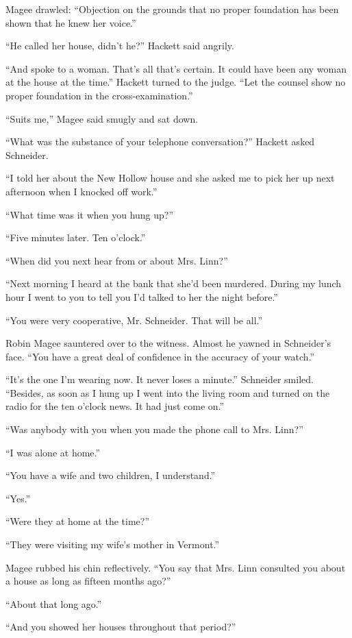 \documentclass{novel}
\begin{document}
Magee drawled: “Objection on the grounds that no proper foundation has been shown that he knew her voice.”

“He called her house, didn’t he?” Hackett said angrily.

“And spoke to a woman. That’s all that’s certain. It could have been any woman at the house at the time.” Hackett turned to the judge. “Let the counsel show no proper foundation in the cross-examination.”

“Suits me,” Magee said smugly and sat down.

“What was the substance of your telephone conversation?” Hackett asked Schneider.

“I told her about the New Hollow house and she asked me to pick her up next afternoon when I knocked off work.”

“What time was it when you hung up?”

“Five minutes later. Ten o’clock.”

“When did you next hear from or about Mrs. Linn?”

“Next morning I heard at the bank that she’d been murdered. During my lunch hour I went to you to tell you I’d talked to her the night before.”

“You were very cooperative, Mr. Schneider. That will be all.”

\scenestars

Robin Magee sauntered over to the witness. Almost he yawned in Schneider’s face. “You have a great deal of confidence in the accuracy of your watch.”

“It’s the one I’m wearing now. It never loses a minute.” Schneider smiled. “Besides, as soon as I hung up I went into the living room and turned on the radio for the ten o’clock news. It had just come on.”

“Was anybody with you when you made the phone call to Mrs. Linn?”

“I was alone at home.”

“You have a wife and two children, I understand.”

“Yes.”

“Were they at home at the time?”

“They were visiting my wife’s mother in Vermont.”

Magee rubbed his chin reflectively. “You say that Mrs. Linn consulted you about a house as long as fifteen months ago?”

“About that long ago.”

“And you showed her houses throughout that period?”
\end{document}
